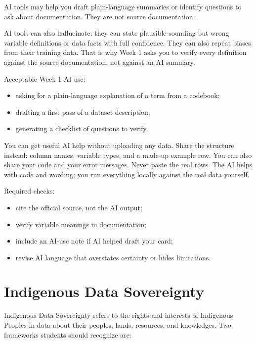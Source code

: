 \documentclass[
  letterpaper,
  DIV=11,
  numbers=noendperiod,
  oneside]{scrreprt}
\providecommand{\tightlist}{%
  \setlength{\itemsep}{0pt}\setlength{\parskip}{0pt}}
\begin{document}

AI tools may help you draft plain-language summaries or identify
questions to ask about documentation. They are not source documentation.

AI tools can also hallucinate: they can state plausible-sounding but
wrong variable definitions or data facts with full confidence. They can
also repeat biases from their training data. That is why Week 1 asks you
to verify every definition against the source documentation, not against
an AI summary.

Acceptable Week 1 AI use:

\begin{itemize}
\tightlist
\item
  asking for a plain-language explanation of a term from a codebook;
\item
  drafting a first pass of a dataset description;
\item
  generating a checklist of questions to verify.
\end{itemize}

You can get useful AI help without uploading any data. Share the
structure instead: column names, variable types, and a made-up example
row. You can also share your code and your error messages. Never paste
the real rows. The AI helps with code and wording; you run everything
locally against the real data yourself.

Required checks:

\begin{itemize}
\tightlist
\item
  cite the official source, not the AI output;
\item
  verify variable meanings in documentation;
\item
  include an AI-use note if AI helped draft your card;
\item
  revise AI language that overstates certainty or hides limitations.
\end{itemize}

\section*{Indigenous Data
Sovereignty}\label{indigenous-data-sovereignty}


Indigenous Data Sovereignty refers to the rights and interests of
Indigenous Peoples in data about their peoples, lands, resources, and
knowledges. Two frameworks students should recognize are:
\end{document}
